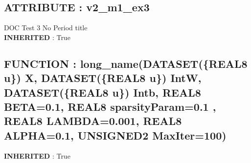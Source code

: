 \subsection*{ATTRIBUTE : v2\_m1\_ex3}
\hypertarget{ecldoc:intest.example_4_example_3.mod_1.v2_m1_ex3}{}
DOC Test 3 No Period title \\
\textbf{INHERITED} : True \\
\subsection*{FUNCTION : long\_name(DATASET(\{REAL8 u\}) X, DATASET(\{REAL8 u\}) IntW, DATASET(\{REAL8 u\}) Intb, REAL8 BETA=0.1, REAL8 sparsityParam=0.1 , REAL8 LAMBDA=0.001, REAL8 ALPHA=0.1, UNSIGNED2 MaxIter=100)}
\hypertarget{ecldoc:intest.example_4_example_3.mod_1.long_name}{}
\textbf{INHERITED} : True \\


